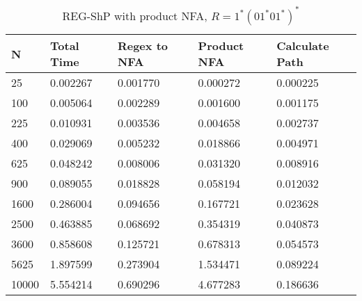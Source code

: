 \documentclass[]{article}
\numberwithin{equation}{section}
\begin{document}
\begin{appendices}
\begin{table}[H]
	\centering
	\small
	\setlength\tabcolsep{2pt}
	\begin{tabular}{|l|l|l|l|l|}
		\hline
		N     & Total Time & Regex to NFA & Product NFA & Calculate Path \\ \hline
		25    & 0.002267   & 0.001770     & 0.000272    & 0.000225       \\ \hline
		100   & 0.005064   & 0.002289     & 0.001600    & 0.001175       \\ \hline
		225   & 0.010931   & 0.003536     & 0.004658    & 0.002737       \\ \hline
		400   & 0.029069   & 0.005232     & 0.018866    & 0.004971       \\ \hline
		625   & 0.048242   & 0.008006     & 0.031320    & 0.008916       \\ \hline
		900   & 0.089055   & 0.018828     & 0.058194    & 0.012032       \\ \hline
		1600  & 0.286004   & 0.094656     & 0.167721    & 0.023628       \\ \hline
		2500  & 0.463885   & 0.068692     & 0.354319    & 0.040873       \\ \hline
		3600  & 0.858608   & 0.125721     & 0.678313    & 0.054573       \\ \hline
		5625  & 1.897599   & 0.273904     & 1.534471    & 0.089224       \\ \hline
		10000 & 5.554214   & 0.690296     & 4.677283    & 0.186636       \\ \hline
	\end{tabular}
	\caption{REG-ShP with product NFA, $R = 1^*(01^*01^*)^*$}
\end{table}


\end{appendices}
\end{document}
